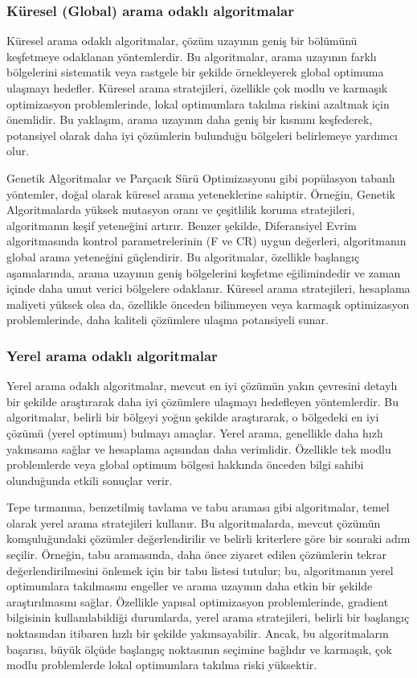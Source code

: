 \subsubsection{Küresel (Global) arama odaklı algoritmalar}

Küresel arama odaklı algoritmalar, çözüm uzayının geniş bir bölümünü keşfetmeye odaklanan yöntemlerdir. Bu algoritmalar, arama uzayının farklı bölgelerini sistematik veya rastgele bir şekilde örnekleyerek global optimuma ulaşmayı hedefler. Küresel arama stratejileri, özellikle çok modlu ve karmaşık optimizasyon problemlerinde, lokal optimumlara takılma riskini azaltmak için önemlidir. Bu yaklaşım, arama uzayının daha geniş bir kısmını keşfederek, potansiyel olarak daha iyi çözümlerin bulunduğu bölgeleri belirlemeye yardımcı olur.

Genetik Algoritmalar ve Parçacık Sürü Optimizasyonu gibi popülasyon tabanlı yöntemler, doğal olarak küresel arama yeteneklerine sahiptir. Örneğin, Genetik Algoritmalarda yüksek mutasyon oranı ve çeşitlilik koruma stratejileri, algoritmanın keşif yeteneğini artırır. Benzer şekilde, Diferansiyel Evrim algoritmasında kontrol parametrelerinin (F ve CR) uygun değerleri, algoritmanın global arama yeteneğini güçlendirir. Bu algoritmalar, özellikle başlangıç aşamalarında, arama uzayının geniş bölgelerini keşfetme eğilimindedir ve zaman içinde daha umut verici bölgelere odaklanır. Küresel arama stratejileri, hesaplama maliyeti yüksek olsa da, özellikle önceden bilinmeyen veya karmaşık optimizasyon problemlerinde, daha kaliteli çözümlere ulaşma potansiyeli sunar.

\subsubsection{Yerel arama odaklı algoritmalar}

Yerel arama odaklı algoritmalar, mevcut en iyi çözümün yakın çevresini detaylı bir şekilde araştırarak daha iyi çözümlere ulaşmayı hedefleyen yöntemlerdir. Bu algoritmalar, belirli bir bölgeyi yoğun şekilde araştırarak, o bölgedeki en iyi çözümü (yerel optimum) bulmayı amaçlar. Yerel arama, genellikle daha hızlı yakınsama sağlar ve hesaplama açısından daha verimlidir. Özellikle tek modlu problemlerde veya global optimum bölgesi hakkında önceden bilgi sahibi olunduğunda etkili sonuçlar verir.

Tepe tırmanma, benzetilmiş tavlama ve tabu araması gibi algoritmalar, temel olarak yerel arama stratejileri kullanır. Bu algoritmalarda, mevcut çözümün komşuluğundaki çözümler değerlendirilir ve belirli kriterlere göre bir sonraki adım seçilir. Örneğin, tabu aramasında, daha önce ziyaret edilen çözümlerin tekrar değerlendirilmesini önlemek için bir tabu listesi tutulur; bu, algoritmanın yerel optimumlara takılmasını engeller ve arama uzayının daha etkin bir şekilde araştırılmasını sağlar. Özellikle yapısal optimizasyon problemlerinde, gradient bilgisinin kullanılabildiği durumlarda, yerel arama stratejileri, belirli bir başlangıç noktasından itibaren hızlı bir şekilde yakınsayabilir. Ancak, bu algoritmaların başarısı, büyük ölçüde başlangıç noktasının seçimine bağlıdır ve karmaşık, çok modlu problemlerde lokal optimumlara takılma riski yüksektir.

